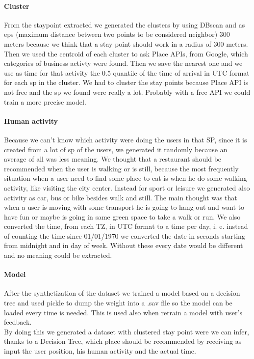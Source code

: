 \documentclass[../../main]{subfiles}
\begin{document}
\paragraph{Cluster}
From the staypoint extracted we generated the clusters by using DBscan and as eps (maximum distance between two points to be considered neighbor) 
300 meters because we think that a stay point should work in a radius of 300 meters. Then we used the centroid of each cluster to ask Place APIs, from Google, 
which categories of business activty were found. Then we save the nearest one and we use as time for that activity the 0.5 quantile of the time of arrival in UTC format for each sp in the cluster.
We had to cluster the stay points because Place API is not free and the sp we found were really a lot. Probably with a free API we could train a more precise model.

\paragraph{Human activity}
Because we can't know which activity were doing the users in that SP, since it is created from a lot of sp of the users, we generated it randomly 
because an average of all was less meaning. We thought that a restaurant should be recommended when the user is walking or is still, because
the most frequently situation when a user need to find some place to eat is when he do some walking activity, like visiting the city center.
Instead for sport or leisure we generated also activity as car, bus or bike besides walk and still. The main thought was that when a user is moving with 
some transport he is going to hang out and want to have fun or maybe is going in same green space to take a walk or run.
We also converted the time, from each TZ, in UTC format to a time per day, i. e. instead of counting the time since 01/01/1970 we converted the date in seconds starting from midnight and 
in day of week. Without these every date would be different and no meaning could be extracted.

\paragraph{Model}
After the synthetization of the dataset we trained a model based on a decision tree and used pickle to dump the weight into a .sav file so the model can be loaded 
every time is needed. This is used also when retrain a model with user's feedback.
\\
By doing this we generated a dataset with clustered stay point were we can infer, thanks to a Decision Tree, which place should be recommended by 
receiving as input the user position, his human activity and the actual time.
\end{document}
